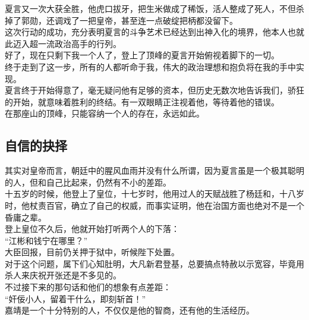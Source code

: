 \begin{multicols}{\theparacolNo}
夏言又一次大获全胜，他虎口拔牙，把生米做成了稀饭，活人整成了死人，不但杀掉了郭勋，还调戏了一把皇帝，甚至连一点破绽把柄都没留下。\\

这次行动的成功，充分表明夏言的斗争艺术已经达到出神入化的境界，他本人也就此迈入超一流政治高手的行列。\\

好了，现在只剩下我一个人了，登上了顶峰的夏言开始俯视着脚下的一切。\\

终于走到了这一步，所有的人都听命于我，伟大的政治理想和抱负将在我的手中实现。\\

夏言终于开始得意了，毫无疑问他有足够的资本，但历史无数次地告诉我们，骄狂的开始，就意味着胜利的终结。有一双眼睛正注视着他，等待着他的错误。\\

在那座山的顶峰，只能容纳一个人的存在，永远如此。\\

\subsection{自信的抉择}
其实对皇帝而言，朝廷中的腥风血雨并没有什么所谓，因为夏言虽是一个极其聪明的人，但和自己比起来，仍然有不小的差距。\\

十五岁的时候，他登上了皇位，十七岁时，他用过人的天赋战胜了杨廷和，十八岁时，他杖责百官，确立了自己的权威，而事实证明，他在治国方面也绝对不是一个昏庸之辈。\\

登上皇位不久后，他就开始打听两个人的下落：\\

“江彬和钱宁在哪里？”\\

大臣回报，目前仍关押于狱中，听候陛下处置。\\

对于这个问题，属下们心知肚明，大凡新君登基，总要搞点特赦以示宽容，毕竟用杀人来庆祝开张还是不多见的。\\

不过接下来的那句话和他们的想象有点差距：\\

“奸佞小人，留着干什么，即刻斩首！”\\

嘉靖是一个十分特别的人，不仅仅是他的智商，还有他的生活经历。\\


\end{multicols}

